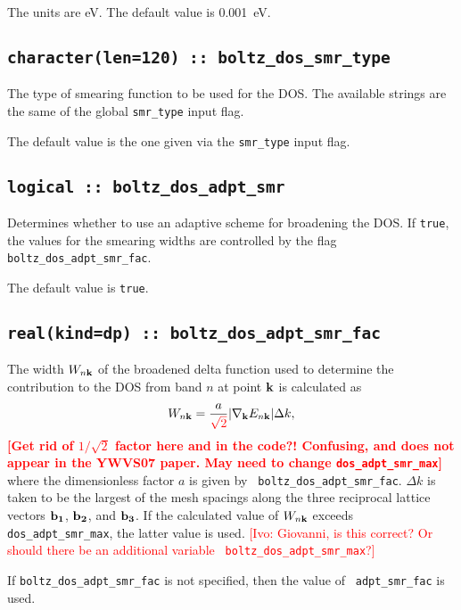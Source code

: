 The units are eV.
The default value is 0.001~eV.

\subsection[boltz\_dos\_smr\_type]{\tt character(len=120) :: boltz\_dos\_smr\_type}
The type of smearing function to be used for the DOS. The available strings are the same of the global {\tt smr\_type} input flag. 

The default value is the one given via the {\tt smr\_type} input flag. 


\subsection[boltz\_dos\_adpt\_smr]{\tt logical :: boltz\_dos\_adpt\_smr}
Determines whether to use an adaptive scheme for broadening the
DOS. If \verb#true#, the values for the smearing widths are 
controlled by the flag {\tt boltz\_dos\_adpt\_smr\_fac}.

The default value is \verb#true#.



\subsection[boltz\_dos\_adpt\_smr\_fac]{\tt real(kind=dp) :: boltz\_dos\_adpt\_smr\_fac}

The width $W_{n{\bf k}}$ of the broadened delta function used to
determine the contribution to the DOS from band $n$ at point ${\bf k}$
is calculated as
%
$$
W_{n{\bf k}}=\frac{a}{\textcolor{red}{\sqrt{2}}}\vert
\nabla_{\bf k} E_{n{\bf k}}\vert \Delta k,
$$ 
%
\textcolor{red}{{\bf [Get rid of $1/\sqrt{2}$ factor here and in the
    code?!  Confusing, and does not appear in the YWVS07 paper. May
    need to change
    {\tt dos\_adpt\_smr\_max}]}}\\
where the dimensionless factor $a$ is given by {\tt
  boltz\_dos\_adpt\_smr\_fac}. $\Delta k$ is taken to be the
largest of the mesh spacings along the three reciprocal lattice
vectors ${\bf b_1}$, ${\bf b_2}$, and ${\bf b_3}$.  If the calculated
value of $W_{n{\bf k}}$ exceeds {\tt dos\_adpt\_smr\_max}, the
latter value is used.  \textcolor{red}{[Ivo: Giovanni, is this correct? Or
  should there be an additional variable {\tt
    boltz\_dos\_adpt\_smr\_max}?]}


If {\tt boltz\_dos\_adpt\_smr\_fac} is not specified, then the value of {\tt
  adpt\_smr\_fac} is used.  

